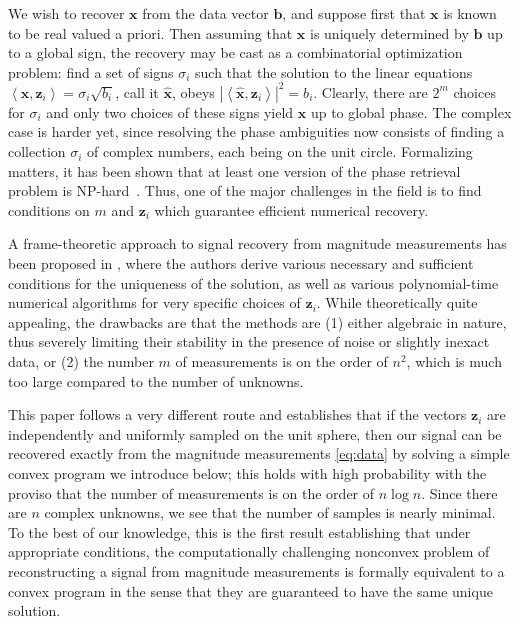 \documentclass[11pt]{article}
\newcommand{\<}{\langle}
\renewcommand{\>}{\rangle}
\newcommand{\bx}{\bm{x}}
\newcommand{\bb}{\bm{b}}
\newcommand{\bz}{\bm{z}}
\numberwithin{equation}{section}
\begin{document}
We wish to recover $\bx$ from the data vector $\bb$, and suppose first
that $\bx$ is known to be real valued a priori. Then assuming that
$\bx$ is uniquely determined by $\bb$ up to a global sign, the
recovery may be cast as a combinatorial optimization problem: find a
set of signs $\sigma_i$ such that the solution to the linear equations
$ \left<\bx,\bz_i\right> = \sigma_i \sqrt{b_i}$, call it $\hat{\bx}$,
obeys $|\left<\hat{\bx},\bz_i\right>|^2 = b_i$.  Clearly, there are
$2^m$ choices for $\sigma_i$ and only two choices of these signs yield
$\bx$ up to global phase.  The complex case is harder yet, since
resolving the phase ambiguities now consists of finding a collection
$\sigma_i$ of complex numbers, each being on the unit
circle. Formalizing matters, it has been shown that at least one
version of the phase retrieval problem is NP-hard~\cite{SC91}.  Thus,
one of the major challenges in the field is to find conditions on $m$
and $\bz_i$ which guarantee efficient numerical recovery.



A frame-theoretic approach to signal recovery from magnitude
measurements has been proposed in \cite{BCE06,BBC07,BBC09}, where the
authors derive various necessary and sufficient conditions for the
uniqueness of the solution, as well as various polynomial-time
numerical algorithms for very specific choices of $\bz_i$.  While
theoretically quite appealing, the drawbacks are that the methods are
(1) either algebraic in nature, thus severely limiting their stability
in the presence of noise or slightly inexact data, or (2) the number
$m$ of measurements is on the order of $n^2$, which is much too large
compared to the number of unknowns.

This paper follows a very different route and establishes that if the
vectors $\bz_i$ are independently and uniformly sampled on the unit
sphere, then our signal can be recovered exactly from the magnitude
measurements \eqref{eq:data} by solving a simple convex program we
introduce below; this holds with high probability with the proviso
that the number of measurements is on the order of $n \log n$. Since
there are $n$ complex unknowns, we see that the number of samples is
nearly minimal.  To the best of our knowledge, this is the first
result establishing that under appropriate conditions, the
computationally challenging nonconvex problem of reconstructing a
signal from magnitude measurements is formally equivalent to a convex
program in the sense that they are guaranteed to have the same unique
solution.  
\end{document}
